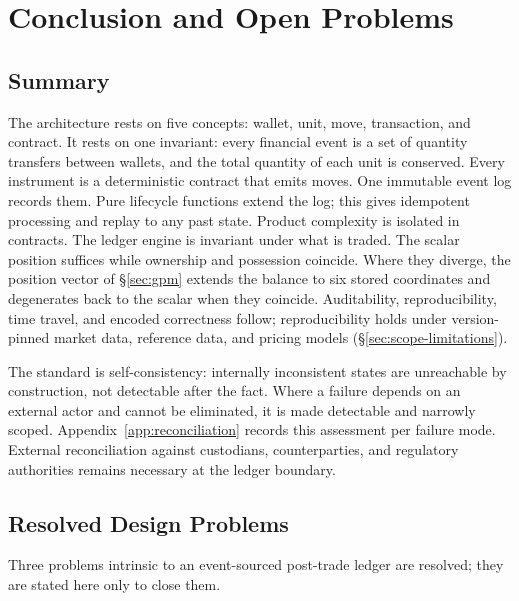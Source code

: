 \section{Conclusion and Open Problems}
\label{sec:conclusion}

\subsection{Summary}

The architecture rests on five concepts: wallet, unit, move, transaction, and contract. It rests on one invariant: every financial event is a set of quantity transfers between wallets, and the total quantity of each unit is conserved. Every instrument is a deterministic contract that emits moves. One immutable event log records them. Pure lifecycle functions extend the log; this gives idempotent processing and replay to any past state. Product complexity is isolated in contracts. The ledger engine is invariant under what is traded. The scalar position suffices while ownership and possession coincide. Where they diverge, the position vector of \S\ref{sec:gpm} extends the balance to six stored coordinates and degenerates back to the scalar when they coincide. Auditability, reproducibility, time travel, and encoded correctness follow; reproducibility holds under version-pinned market data, reference data, and pricing models (\S\ref{sec:scope-limitations}).

The standard is self-consistency: internally inconsistent states are unreachable by construction, not detectable after the fact. Where a failure depends on an external actor and cannot be eliminated, it is made detectable and narrowly scoped. Appendix~\ref{app:reconciliation} records this assessment per failure mode. External reconciliation against custodians, counterparties, and regulatory authorities remains necessary at the ledger boundary.

\subsection{Resolved Design Problems}

Three problems intrinsic to an event-sourced post-trade ledger are resolved; they are stated here only to close them.

